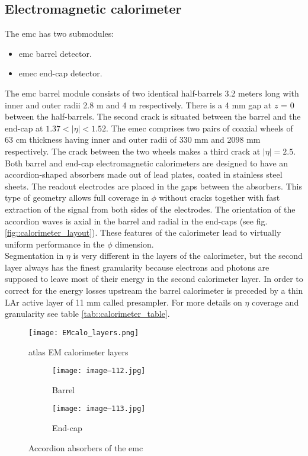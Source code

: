         \subsection{Electromagnetic calorimeter }
        \label{emc}
        The \gls{emc} has two submodules:
        \begin{itemize}
        	\item \gls{emc} barrel detector.
        	\item \gls{emec} end-cap detector.
        \end{itemize}
        The \gls{emc} barrel module consists of two identical half-barrels 3.2 meters long with inner and outer radii 2.8 m and 4 m respectively. There is a 4 mm gap at $z$ = 0 between the half-barrels. The second crack is situated between the barrel and the end-cap at $1.37 < |\eta| < 1.52$. The \gls{emec} comprises two pairs of coaxial wheels of 63 cm thickness having inner and outer radii of 330 mm and 2098 mm respectively. The crack between the two wheels makes a third crack at  $|\eta| = 2.5$.
        Both barrel and end-cap electromagnetic calorimeters are designed to have an accordion-shaped absorbers made out of lead plates, coated in stainless steel sheets. The readout electrodes are placed in the gaps between the absorbers. This type of geometry allows full coverage in $\phi$ without cracks together with fast extraction of the signal from both sides of the electrodes. The orientation of the accordion waves is axial in the barrel and radial in the end-caps (see fig. \ref{fig::calorimeter_layout}). These features of the calorimeter lead to virtually uniform performance in the $\phi$ dimension. \\
        Segmentation in $\eta$  is very different in the layers of the calorimeter, but the second layer always has the finest granularity because electrons and photons are supposed to leave most of their energy in the second calorimeter layer. In order to correct for the energy losses upstream the barrel calorimeter is preceded by a thin LAr active layer of 11 mm called presampler. For more details on $\eta$ coverage and granularity see table \ref{tab::calorimeter_table}.

        \begin{figure}[htpb]
        	\texttt{[image: EMcalo\_layers.png]}
        	\caption{ \gls{atlas} EM calorimeter layers}
        	\label{fig::calorimeter_layers}
        \end{figure}
    
        \begin{figure}[htbp]
        			\begin{subfigure}[t]{0.48\textwidth}
        				\texttt{[image: image--112.jpg]}
        				\caption[Barrel]{Barrel}
        				\label{fig::barrel}
		\end{subfigure}
        		                \hfill
        \begin{subfigure}[t]{0.48\textwidth} 
				\texttt{[image: image--113.jpg]}
				\caption[End-cap]{End-cap}
				\label{fig::end-cap}
		\end{subfigure}
			\caption{Accordion absorbers of the \gls{emc}}
			\label{fig::accordion}
		\end{figure}
